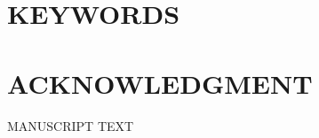 \documentclass[12pt,english]{article}
\begin{document}
\section*{KEYWORDS}
\PAPERKEYWORDS
\clearpage 

\doublespacing
\section*{ACKNOWLEDGMENT}
\ACKNOWLEDGMENTS
\clearpage 

\setcounter{page}{1}
\renewcommand*{\thefootnote}{\arabic{footnote}}
\begingroup
  \centering
  \Large MANUSCRIPT TEXT\\[1em]
\endgroup


\pagebreak
\begingroup
{}
\setlength\bibitemsep{5.0pt}
\printbibliography[title=References for Manuscript]
\endgroup
\pagebreak



\appendix
\begin{refsection}

\setcounter{page}{1}
\end{refsection}
\end{document}
